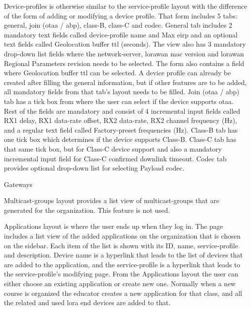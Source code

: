 Device-profiles is otherwise similar to the service-profile layout with the difference of the form of adding or modifying a device profile.
That form includes 5 tabs: general, join (\gls{otaa} / \gls{abp}), class-B, class-C and codec.
General tab includes 2 mandatory text fields called device-profile name and Max \gls{eirp} and an optional text fields called Geolocation buffer \gls{ttl} (seconds). The view also has 3 mandatory drop-down list fields where the network-server, \gls{lorawan} \gls{mac} version and \gls{lorawan} Regional Parameters revision needs to be selected.
The form also contains a field where Geolocation buffer \gls{ttl} can be selected.
A device profile can already be created after filling the general information, but if other features are to be added, all mandatory fields from that tab's layout needs to be filled.
Join (\gls{otaa} / \gls{abp}) tab has a tick box from where the user can select if the device supports \gls{otaa}.
Rest of the fields are mandatory and consist of 4 incremental input fields called RX1 delay, RX1 data-rate offset, RX2 data-rate, RX2 channel frequency (Hz), and a regular text field called Factory-preset frequencies (Hz).
Class-B tab has one tick box which determines if the device supports Class-B.
Class-C tab  has that same tick box, but for Class-C device support and also a mandatory incremental input field for Class-C confirmed downlink timeout.
Codec tab provides optional drop-down list for selecting Payload codec.

Gateways

Multicast-groups layout provides a list view of multicast-groups that are generated for the organization. This feature is not used.

Applications layout is where the user ends up when they log in.
The page includes a list view of the added applications on the organization that is chosen on the sidebar.
Each item of the list is shown with its ID, name, service-profile and description.
Device name is a hyperlink that leads to the list of devices that are added to the application, and the service-profile is a hyperlink that leads to the service-profile's modifying page.
From the Applications layout the user can either choose an existing application or create new one.
Normally when a new course is organized the educator creates a new application for that class, and all the related and used \gls{lora} end devices are added to that.

